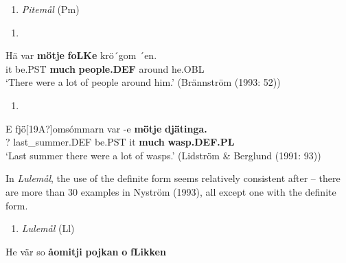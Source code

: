 \begin{enumerate} %
\item 
\textit{Pitemål} (Pm)
\end{enumerate} %
\setcounter{listLFOxcviiileveli}{0}
\begin{enumerate} %
\item 
\end{enumerate} %
\ea\label{}
\gll Hä  var  \textbf{mö{\textasciigrave}tje}\textbf{  foLKe} krö´gom  ´en.\\


it  be.PST  \textbf{much} \textbf{people.DEF} around  he.OBL\\ %


‘There were a lot of people around him.’ (Brännström (1993: 52))
\z

\begin{enumerate} %
\item 
\end{enumerate} %
\ea\label{}
\gll E  fj\={ö}[19A?]omsómmarn  var  {}-e  \textbf{m\={ö}tje}\textbf{  dj\={ä}tinga.}\\


?  last\_summer.DEF  be.PST  it  \textbf{much} \textbf{wasp.DEF.PL}\\ %


‘Last summer there were a lot of wasps.’ (Lidström \& Berglund (1991: 93))
\z

In \textit{Lulemål}, the use of the definite form seems relatively consistent after  – there are more than 30 examples in Nyström (1993), all except one with the definite form. 

\begin{enumerate} %
\item 
\textit{Lulemål }(Ll)
\end{enumerate} %
\ea\label{}
\gll He  vär  so  \textbf{åomitji} \textbf{pojkan} \textbf{o} \textbf{fLikken}\\


